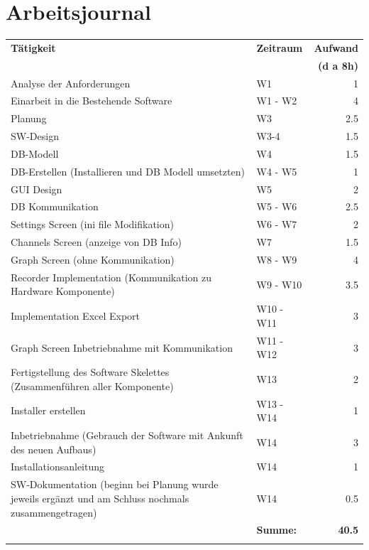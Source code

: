 \documentclass[10pt]{scrartcl}
\begin{document}
\section{Arbeitsjournal}
\begin{center}
	\begin{tabular}{p{6cm} | l | r}
		\textbf{Tätigkeit} & \textbf{Zeitraum} & \textbf{Aufwand} \\ &&\textbf{(d a 8h)}\\
		\hline Analyse der Anforderungen & W1 & 1 \\
		\hline Einarbeit in die Bestehende Software & W1 - W2 & 4 \\
		\hline Planung & W3 & 2.5 \\
		\hline SW-Design & W3-4 & 1.5 \\
		\hline DB-Modell & W4 & 1.5 \\
		\hline DB-Erstellen (Installieren und DB Modell umsetzten) & W4 - W5 & 1 \\
		\hline GUI Design & W5 & 2 \\
		\hline DB Kommunikation & W5 - W6 & 2.5 \\
		\hline Settings Screen (ini file Modifikation) & W6 - W7 & 2 \\
		\hline Channels Screen (anzeige von DB Info) & W7 & 1.5 \\
		\hline Graph Screen (ohne Kommunikation) & W8 - W9 & 4 \\
		\hline Recorder Implementation (Kommunikation zu Hardware Komponente) & W9 - W10 & 3.5 \\
		\hline Implementation Excel Export & W10 - W11 & 3 \\
		\hline Graph Screen Inbetriebnahme mit Kommunikation & W11 - W12 & 3 \\
		\hline Fertigstellung des Software Skelettes (Zusammenführen aller Komponente) & W13 & 2 \\
		\hline Installer erstellen & W13 - W14 & 1 \\
		\hline Inbetriebnahme (Gebrauch der Software mit Ankunft des neuen Aufbaus) & W14 & 3 \\
		\hline Installationsanleitung & W14 & 1 \\
		\hline SW-Dokumentation (beginn bei Planung wurde jeweils ergänzt und am Schluss nochmals zusammengetragen) & W14 & 0.5 \\\hhline{~--}
		& \textbf{Summe:} & \textbf{40.5} \\\hhline{~~=}
	\end{tabular}
\end{center}
\end{document}
